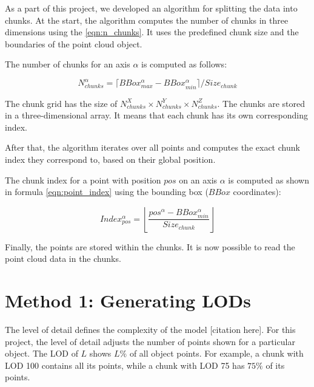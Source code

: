 As a part of this project, we developed an algorithm for splitting the data into chunks. At the start, the algorithm computes the number of chunks in three dimensions using the \autoref{eqn:n_chunks}. It uses the predefined chunk size and the boundaries of the point cloud object.

The number of chunks for an axis $\alpha$ is computed as follows:

\begin{equation}
\label{eqn:n_chunks}
N_{chunks}^\alpha = \lceil BBox_{max}^\alpha - BBox_{min}^\alpha \rceil / Size_{chunk}
\end{equation}

The chunk grid has the size of $N_{chunks}^X \times N_{chunks}^Y \times N_{chunks}^Z$. The chunks are stored in a three-dimensional array. It means that each chunk has its own corresponding index.

After that, the algorithm iterates over all points and computes the exact chunk index they correspond to, based on their global position.

The chunk index for a point with position $pos$ on an axis $\alpha$ is computed as shown in formula \ref{eqn:point_index} using the bounding box ($BBox$ coordinates):

\begin{equation}
\label{eqn:point_index}
Index_{pos}^\alpha = \left \lfloor \frac{pos^{\alpha} - BBox_{min}^\alpha}{Size_{chunk}} \right \rfloor
\end{equation}

Finally, the points are stored within the chunks. It is now possible to read the point cloud data in the chunks.


\section{Method 1: Generating LODs}
\label{sec:generating_lods}

The level of detail defines the complexity of the model [citation here]. For this project, the level of detail adjusts the number of points shown for a particular object.
The LOD of $L$ shows $L\%$ of all object points. For example, a chunk with LOD 100 contains all its points, while a chunk with LOD 75 has $75\%$ of its points.


